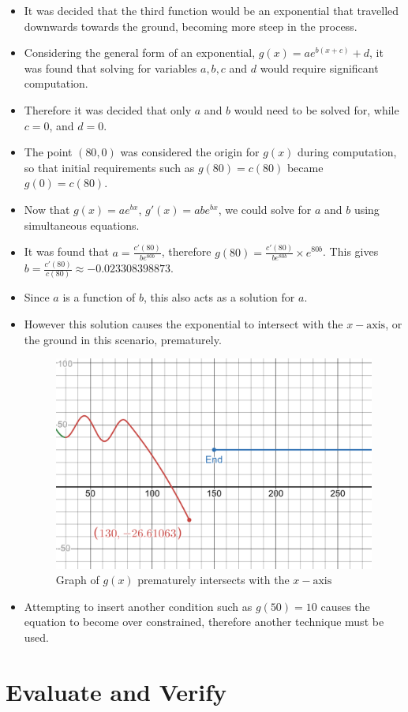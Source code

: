 \documentclass[11pt, letterpaper]{article}
\begin{document}
\begin{itemize}
	\item It was decided that the third function would be an exponential that travelled downwards towards the ground, becoming more steep in the process. 
	\item Considering the general form of an exponential, $g(x)=ae^{b(x+c)}+d$, it was found that solving for variables $a, b, c$ and $d$ would require significant computation.
	\item Therefore it was decided that only $a$ and $b$ would need to be solved for, while $c=0$, and $d=0$.
	\item The point $(80, 0)$ was considered the origin for $g(x)$ during computation, so that  initial requirements such as $g(80)=c(80)$ became $g(0)=c(80)$. 
	\item Now that $g(x)=ae^{bx}$, $g'(x)=abe^{bx}$, we could solve for $a$ and $b$ using simultaneous equations.
	\item It was found that $a=\frac{c'(80)}{be^{80b}}$, therefore $g(80)=\frac{c'(80)}{be^{80b}}\times e^{80b}$. This gives $b=\frac{c'(80)}{c(80)}\approx -0.023308398873$.
	\item Since $a$ is a function of $b$, this also acts as a solution for $a$.
	\item However this solution causes the exponential to intersect with the $x-\textrm{axis}$, or the ground in this scenario, prematurely. 
	\begin{figure}[h]
		\centering
		\includegraphics[width=15cm]{PrematureIntersecion.png}
		\caption{Graph of $g(x)$ prematurely intersects with the $x-\textrm{axis}$}
	\end{figure}
	\item Attempting to insert another condition such as $g(50)=10$ causes the equation to become over constrained, therefore another technique must be used. 
\end{itemize}






\section{Evaluate and Verify}
\end{document}

